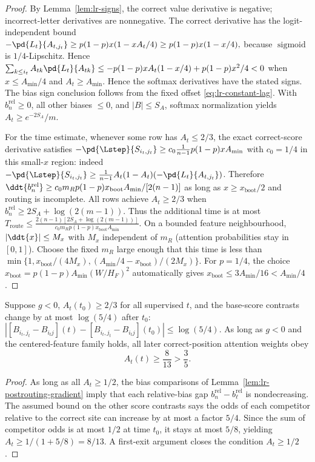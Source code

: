 \begin{proof}
By Lemma~\ref{lem:lr-signs}, the correct value derivative is negative;
incorrect-letter derivatives are nonnegative.  The correct derivative has the logit-independent bound
 $-\pd{L_t}{A_{t,j_t}}\ge p(1-p) x(1-xA_t/4)\ge p(1-p) x(1-x/4),$ 
because $\operatorname{sigmoid}$ is $1/4$-Lipschitz. Hence
 $\sum_{k\le i_t}A_{tk}\pd{L_t}{A_{tk}}\le-p(1-p) x A_t(1-x/4)+p(1-p) x^2/4<0$ 
when $x\le A_{\min}/4$ and $A_t\ge A_{\min}$.  Hence the softmax derivatives have the stated signs.
The bias sign conclusion follows from the fixed offset
\eqref{eq:lr-constant-lag}.
With $b_n^{\mathrm{rel}}\ge0$, all other biases $\le0$,
and $|B|\le S_A$, softmax normalization yields
$A_t\ge e^{-2S_A}/m$.

For the time estimate, whenever some row has $A_t\le2/3$, the exact
correct-score derivative satisfies
$-\pd{\Lstep}{S_{i_t,j_t}}\ge c_0\frac1{n-1}p(1-p) xA_{\min}$
with $c_0=1/4$ in this small-$x$ region: indeed
$-\pd{\Lstep}{S_{i_t,j_t}}\ge\frac1{n-1} A_t(1-A_t)(-\pd{L_t}{A_{t,j_t}})$.
Therefore
$\ddt{b_n^{\mathrm{rel}}}
\ge c_0m_Rp(1-p)x_{\mathrm{boot}} A_{\min}/[2(n-1)]$
as long as $x\ge x_{\mathrm{boot}}/2$ and routing is incomplete.
All rows achieve $A_t\ge2/3$ when
$b_n^{\mathrm{rel}}\ge
2S_A+\log(2(m-1))$.
Thus the additional time is at most
 $T_{\mathrm{route}} \le \frac{2(n-1)[2S_A+\log(2(m-1))]} {c_0m_Rp(1-p)x_{\mathrm{boot}} A_{\min}}.$ 
On a bounded feature neighbourhood, $|\ddt{x}|\le M_x$ with $M_x$
independent of $m_R$ (attention probabilities stay in $[0,1]$).
Choose the fixed $m_R$ large enough that this time is less than
$\min\{1,x_{\mathrm{boot}}/(4M_x),(A_{\min}/4-x_{\mathrm{boot}})/(2M_x)\}$.
For $p=1/4$, the choice $x_{\mathrm{boot}}=p(1-p) A_{\min}(W/H_F)^2$
automatically gives $x_{\mathrm{boot}}\le3A_{\min}/16<A_{\min}/4$.
\end{proof}

\begin{lemma}
\label{lem:lr-post-routing}
Suppose $g<0$, $A_t(t_0)\ge2/3$ for all supervised $t$, and the
base-score contrasts change by at most $\log(5/4)$ after $t_0$:
 $|[B_{i_t,j_t}-B_{i_tj}](t)-[B_{i_t,j_t}-B_{i_tj}](t_0)| \le\log(5/4).$ 
As long as $g<0$ and the centered-feature family holds, all later
correct-position attention weights obey
\begin{equation}\label{eq:lr-post-floor}
 A_t(t)\ge\frac8{13}>\frac35.
\end{equation}
\end{lemma}
\begin{proof}
As long as all $A_t\ge1/2$, the bias comparisons of
Lemma~\ref{lem:lr-postrouting-gradient} imply that each relative-bias
gap $b_n^{\mathrm{rel}}-b_\ell^{\mathrm{rel}}$ is
nondecreasing.  The assumed bound on the other score contrasts says
the odds of each competitor relative to the correct site can increase
by at most a factor $5/4$.  Since the sum of competitor odds is at most
$1/2$ at time $t_0$, it stays at most $5/8$, yielding
$A_t\ge1/(1+5/8)=8/13$.  A first-exit argument closes the condition
$A_t\ge1/2$.
\end{proof}

